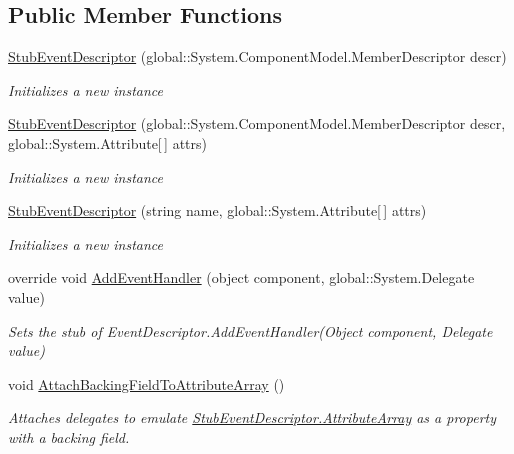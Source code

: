 \subsection*{Public Member Functions}
\begin{DoxyCompactItemize}
\item 
\hyperlink{class_system_1_1_component_model_1_1_fakes_1_1_stub_event_descriptor_a1ab5085b4a84d2a18a5c0c84d73ed312}{Stub\-Event\-Descriptor} (global\-::\-System.\-Component\-Model.\-Member\-Descriptor descr)
\begin{DoxyCompactList}\small\item\em Initializes a new instance\end{DoxyCompactList}\item 
\hyperlink{class_system_1_1_component_model_1_1_fakes_1_1_stub_event_descriptor_ad02a6d21143c009ed079a9e200bab97f}{Stub\-Event\-Descriptor} (global\-::\-System.\-Component\-Model.\-Member\-Descriptor descr, global\-::\-System.\-Attribute\mbox{[}$\,$\mbox{]} attrs)
\begin{DoxyCompactList}\small\item\em Initializes a new instance\end{DoxyCompactList}\item 
\hyperlink{class_system_1_1_component_model_1_1_fakes_1_1_stub_event_descriptor_ada6e0bbc3c6137d85e899d5e0e0b72da}{Stub\-Event\-Descriptor} (string name, global\-::\-System.\-Attribute\mbox{[}$\,$\mbox{]} attrs)
\begin{DoxyCompactList}\small\item\em Initializes a new instance\end{DoxyCompactList}\item 
override void \hyperlink{class_system_1_1_component_model_1_1_fakes_1_1_stub_event_descriptor_a8196f058aa031b44db5b689e29bffc7e}{Add\-Event\-Handler} (object component, global\-::\-System.\-Delegate value)
\begin{DoxyCompactList}\small\item\em Sets the stub of Event\-Descriptor.\-Add\-Event\-Handler(\-Object component, Delegate value)\end{DoxyCompactList}\item 
void \hyperlink{class_system_1_1_component_model_1_1_fakes_1_1_stub_event_descriptor_ad31282dab36cb7eb5b24e52fb029b402}{Attach\-Backing\-Field\-To\-Attribute\-Array} ()
\begin{DoxyCompactList}\small\item\em Attaches delegates to emulate \hyperlink{class_system_1_1_component_model_1_1_fakes_1_1_stub_event_descriptor_a0989f7d1e62728f3ae9d43c8a8d0a7fb}{Stub\-Event\-Descriptor.\-Attribute\-Array} as a property with a backing field.\end{DoxyCompactList}\item 

\end{DoxyCompactItemize}

